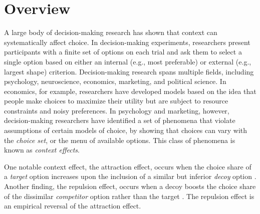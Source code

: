 \section{Overview}
A large body of decision-making research has shown that context can systematically affect choice. In decision-making experiments, researchers present participants with a finite set of options on each trial and ask them to select a single option based on either an internal (e.g., most preferable) or external (e.g., largest shape) criterion. Decision-making research spans multiple fields, including psychology, neuroscience, economics, marketing, and political science. In economics, for example, researchers have developed models based on the idea that people make choices to maximize their utility but are subject to resource constraints and noisy preferences. In psychology and marketing, however, decision-making researchers have identified a set of phenomena that violate assumptions of certain models of choice, by showing that choices can vary with the \textit{choice set}, or the menu of available options. This class of phenomena is known as \textit{context effects}.


One notable context effect, the attraction effect, occurs when the choice share of a \textit{target} option increases upon the inclusion of a similar but inferior \textit{decoy} option \parencite{huberAddingAsymmetricallyDominated1982d}. Another finding, the repulsion effect, occurs when a decoy boosts the choice share of the dissimilar \textit{competitor} option rather than the target \parencite{simonson2014vices}. The repulsion effect is an empirical reversal of the attraction effect. 

